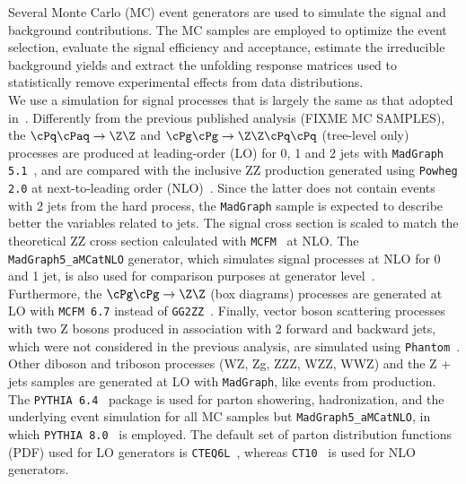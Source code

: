 Several Monte Carlo (MC) event generators are used to simulate the signal and background contributions. The MC samples are employed to optimize the event selection, evaluate the signal efficiency and acceptance, estimate the irreducible background yields and extract the unfolding response matrices used to statistically remove experimental effects from data distributions.\\
We use a simulation for signal processes that is largely the same as that adopted in~\cite{CMS-PAS-SMP-15-012}. Differently from the previous published analysis (FIXME MC SAMPLES), 
the $\cPq\cPaq \to \Z\Z$ and $\cPg\cPg \to \Z\Z\cPq\cPq$ (tree-level only) processes are produced at leading-order (LO) for 0, 1 and 2 jets with \texttt{MadGraph 5.1}~\cite{MadGraph5.1}, and are compared with the inclusive ZZ production generated using \texttt{Powheg 2.0} at next-to-leading order (NLO)~\cite{PowhegMethod, PowhegBox, Melia:2011tj, Nason:2013ydw}. Since the latter does not contain events with 2 jets from the hard process, the \texttt{MadGraph} sample is expected to describe better the variables related to jets. The signal cross section is scaled to match the theoretical ZZ cross section calculated with \texttt{MCFM}~\cite{MCFM} at NLO. The \texttt{MadGraph5\_aMCatNLO} generator, which simulates signal processes at NLO for 0 and 1 jet, is also used for comparison purposes at generator level~\cite{MGatNLO}.  \\
Furthermore,  the $\cPg\cPg  \to \Z\Z$ (box diagrams) processes are generated at LO with \texttt{MCFM 6.7} instead of \texttt{GG2ZZ}~\cite{gg2zz}. Finally, vector boson scattering processes with two Z bosons produced in association with 2 forward and backward jets, which were not considered in the previous analysis, are simulated using \texttt{Phantom}~\cite{Phantom}.\\
Other diboson and triboson processes (WZ, Zg, ZZZ, WZZ, WWZ) and the Z + jets samples are generated at LO with \texttt{MadGraph}, like events from \ttbar production. The \texttt{PYTHIA 6.4}~\cite{Sjostrand:2006za} package is used for parton showering, hadronization, and the underlying event simulation for all MC samples but \texttt{MadGraph5\_aMCatNLO}, in which  \texttt{PYTHIA 8.0}~\cite{Sjostrand:2007gs} is employed. The default set of parton distribution functions (PDF) used for LO generators is \texttt{CTEQ6L}~\cite{CTEQ6L}, whereas \texttt{CT10}~\cite{CT10} is used for NLO generators.

